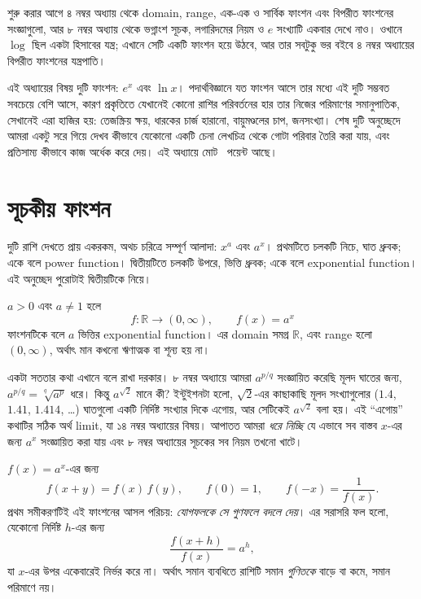\documentclass[11pt]{article}
\begin{document}

\noindent
শুরু করার আগে ৪ নম্বর অধ্যায় থেকে domain, range, এক-এক ও সার্বিক ফাংশন এবং
বিপরীত ফাংশনের সংজ্ঞাগুলো, আর ৮ নম্বর অধ্যায় থেকে ভগ্নাংশ সূচক, লগারিদমের
নিয়ম ও $e$ সংখ্যাটি একবার দেখে নাও। ওখানে $\log$ ছিল একটা হিসাবের যন্ত্র; এখানে
সেটি একটি ফাংশন হয়ে উঠবে, আর তার সবটুকু ভর বইবে ৪ নম্বর অধ্যায়ের বিপরীত
ফাংশনের যন্ত্রপাতি।

এই অধ্যায়ের বিষয় দুটি ফাংশন: $e^{x}$ এবং $\ln x$। পদার্থবিজ্ঞানে যত ফাংশন
আসে তার মধ্যে এই দুটি সম্ভবত সবচেয়ে বেশি আসে, কারণ প্রকৃতিতে যেখানেই কোনো রাশির
পরিবর্তনের হার তার নিজের পরিমাণের সমানুপাতিক, সেখানেই এরা হাজির হয়:
তেজস্ক্রিয় ক্ষয়, ধারকের চার্জ হারানো, বায়ুমণ্ডলের চাপ, জনসংখ্যা। শেষ দুটি
অনুচ্ছেদে আমরা একটু সরে গিয়ে দেখব কীভাবে যেকোনো একটি চেনা লেখচিত্র থেকে গোটা
পরিবার তৈরি করা যায়, এবং প্রতিসাম্য কীভাবে কাজ অর্ধেক করে দেয়। এই অধ্যায়ে
মোট \totalpoints\ পয়েন্ট আছে।

\section{সূচকীয় ফাংশন}

দুটি রাশি দেখতে প্রায় একরকম, অথচ চরিত্রে সম্পূর্ণ আলাদা: $x^{a}$ এবং $a^{x}$।
প্রথমটিতে চলকটি নিচে, ঘাত ধ্রুবক; একে বলে power function। দ্বিতীয়টিতে চলকটি
উপরে, ভিত্তি ধ্রুবক; একে বলে exponential function। এই অনুচ্ছেদ পুরোটাই
দ্বিতীয়টিকে নিয়ে।

\begin{idea}[সূচকীয় ফাংশন]
$a > 0$ এবং $a \neq 1$ হলে
\[
  f \colon \mathbb{R} \to (0, \infty), \qquad f(x) = a^{x}
\]
ফাংশনটিকে বলে $a$ ভিত্তির exponential function। এর domain সমগ্র $\mathbb{R}$,
এবং range হলো $(0,\infty)$, অর্থাৎ মান কখনো ঋণাত্মক বা শূন্য হয় না।
\end{idea}

একটা সততার কথা এখানে বলে রাখা দরকার। ৮ নম্বর অধ্যায়ে আমরা $a^{p/q}$ সংজ্ঞায়িত
করেছি মূলদ ঘাতের জন্য, $a^{p/q} = \sqrt[q]{a^{p}}$ ধরে। কিন্তু $a^{\sqrt{2}}$
মানে কী? ইন্টুইশনটা হলো, $\sqrt{2}$-এর কাছাকাছি মূলদ সংখ্যাগুলোর
($1.4$, $1.41$, $1.414$, \dots) ঘাতগুলো একটি নির্দিষ্ট সংখ্যার দিকে এগোয়, আর
সেটিকেই $a^{\sqrt{2}}$ বলা হয়। এই ``এগোয়'' কথাটির সঠিক অর্থ limit, যা ১৪ নম্বর
অধ্যায়ের বিষয়। আপাতত আমরা \emph{ধরে নিচ্ছি} যে এভাবে সব বাস্তব $x$-এর জন্য
$a^{x}$ সংজ্ঞায়িত করা যায় এবং ৮ নম্বর অধ্যায়ের সূচকের সব নিয়ম তখনো খাটে।

\begin{idea}[সূচকীয় ফাংশনের চরিত্র]
$f(x) = a^{x}$-এর জন্য
\[
  f(x+y) = f(x)\,f(y), \qquad f(0) = 1, \qquad f(-x) = \frac{1}{f(x)} .
\]
প্রথম সমীকরণটিই এই ফাংশনের আসল পরিচয়: \emph{যোগফলকে সে গুণফলে বদলে দেয়}।
এর সরাসরি ফল হলো, যেকোনো নির্দিষ্ট $h$-এর জন্য
\[
  \frac{f(x+h)}{f(x)} = a^{h},
\]
যা $x$-এর উপর একেবারেই নির্ভর করে না। অর্থাৎ সমান ব্যবধিতে রাশিটি সমান
\emph{গুণিতকে} বাড়ে বা কমে, সমান পরিমাণে নয়।
\end{idea}
\end{document}
